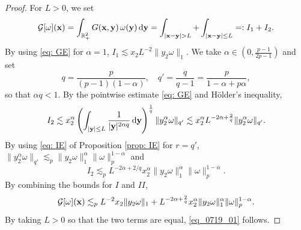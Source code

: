 \documentclass[11pt]{amsart}
\theoremstyle{definition}
\theoremstyle{definition}
\numberwithin{equation}{section}
\newcommand{\0}{\emptyset}
\newcommand{\bfx}{{\bf x}}
\newcommand{\bfy}{{\bf y}}
\newcommand{\calG}{\mathcal G}
\newcommand{\dd}{\mathrm{d}}
\begin{document}
	\begin{proof}
		For $L>0$, we set 
		\[
		\calG[\omega](\bfx) 
		= \int_{\mathbb{R}^2_+} G(\bfx,\bfy)\,\omega(\bfy)\,\dd\bfy
		= \int_{|\bfx-\bfy|>L} + \int_{|\bfx-\bfy|\le L} 
		=: I_1+I_2.
		\]
		By using \eqref{eq: GE} for $\alpha=1$,	$I_1 \lesssim x_2L^{-2}\|y_2\omega\|_{1}$. We take $\alpha \in (0, \frac{p-1}{2p-1})$ and set
		\[
		q = \frac{p}{(p-1)(1-\alpha)}, \quad q'= \frac{q}{q-1} = \frac{p}{1-\alpha+p\alpha},
		\]
		so that $\alpha q < 1$. By the pointwise estimate \eqref{eq: GE} and H\"older's inequality, 
		\[
		I_2 \lesssim x_2^\alpha
		\left(\int_{|\bfy|\le L}\frac{1}{|\bfy|^{2\alpha q}}\,\dd\bfy\right)^{\frac{1}{q}}
		\|y_2^\alpha \omega\|_{q'} \lesssim x_2^\alpha L^{-2\alpha+\frac{2}{q}}\|y_2^\alpha \omega\|_{q'}.
		\]
		By using \eqref{eq: IE} of Proposition \ref{prop: IE} for $r=q'$, $\|y_2^\alpha \omega\|_{q'} \lesssim_p \|y_2\omega\|_{1}^{\alpha}\|\omega\|_{p}^{1-\alpha}$ and
        \[
        I_2 \lesssim_p L^{-2\alpha+2/q}x_2^\alpha \|y_2\omega\|_{1}^{\alpha}\|\omega\|_{p}^{1-\alpha}.
        \]
        By combining the bounds for $I$ and $II$, 
		\[
		\calG[\omega](\bfx)\lesssim_p  L^{-2} x_2 \|y_2\omega\|_{1}
		+L^{-2\alpha+\frac{2}{q}}x_2^\alpha \|y_2\omega\|_{1}^{\alpha}\|\omega\|_{p}^{1-\alpha}.
		\]
		By taking $L>0$ so that the two terms are equal, \eqref{eq_0719_01} follows.
		

\end{proof}
\end{document}
